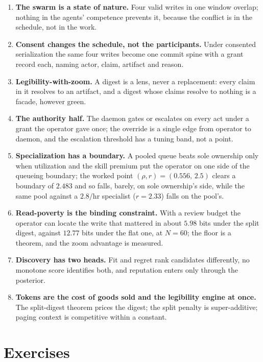 \documentclass[11pt,a4paper]{article}
\theoremstyle{definition}
\theoremstyle{plain}
\begin{document}
\begin{enumerate}[leftmargin=1.6em,itemsep=2pt]
\item \textbf{The swarm is a state of nature.} Four valid writes in one window overlap; nothing in the agents' competence prevents it, because the conflict is in the schedule, not in the work.
\item \textbf{Consent changes the schedule, not the participants.} Under consented serialization the same four writes become one commit spine with a grant record each, naming actor, claim, artifact and reason.
\item \textbf{Legibility-with-zoom.} A digest is a lens, never a replacement: every claim in it resolves to an artifact, and a digest whose claims resolve to nothing is a facade, however green.
\item \textbf{The authority half.} The daemon gates or escalates on every act under a grant the operator gave once; the override is a single edge from operator to daemon, and the escalation threshold has a tuning band, not a point.
\item \textbf{Specialization has a boundary.} A pooled queue beats sole ownership only when utilization and the skill premium put the operator on one side of the queueing boundary; the worked point $(\rho,r)=(0.556,\,2.5)$ clears a boundary of $2.483$ and so falls, barely, on sole ownership's side, while the same pool against a $2.8/\text{hr}$ specialist ($r=2.33$) falls on the pool's.
\item \textbf{Read-poverty is the binding constraint.} With a review budget the operator can locate the write that mattered in about $5.98$ bits under the split digest, against $12.77$ bits under the flat one, at $N=60$; the floor is a theorem, and the zoom advantage is measured.
\item \textbf{Discovery has two heads.} Fit and regret rank candidates differently, no monotone score identifies both, and reputation enters only through the posterior.
\item \textbf{Tokens are the cost of goods sold and the legibility engine at once.} The split-digest theorem prices the digest; the split penalty is super-additive; paging context is competitive within a constant.
\end{enumerate}

\section{Exercises}
\label{sec:ls-exercises}
\end{document}
